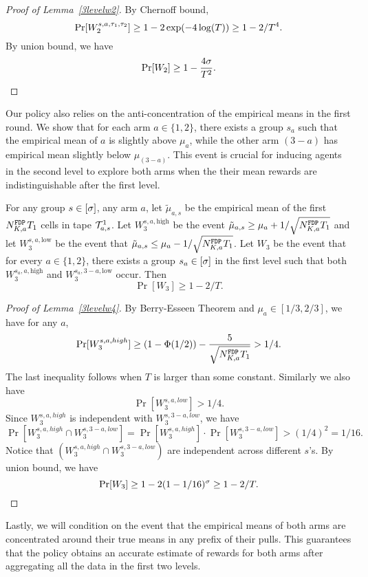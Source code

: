 \begin{proof}[Proof of Lemma~\ref{3levelw2}]
  By Chernoff bound,
\[
\Pr[W_2^{s,a,\tau_1,\tau_2}] \geq 1 - 2\exp(-4\log(T)) \geq 1- 2/T^4.
\]
By union bound, we have
\[
\Pr[W_2] \geq 1- \frac{4\sigma}{T^2}.
\]
\end{proof}

Our policy also relies on the anti-concentration of the empirical
means in the first round. We show that for each arm $a\in \{1, 2\}$,
there exists a group $s_a$ such that the empirical mean of $a$ is
slightly above $\mu_a$, while the other arm $(3 - a)$ has empirical
mean slightly below $\mu_{(3-a)}$. This event is crucial for inducing
agents in the second level to explore both arms when the their
mean rewards are indistinguishable after the first level.


\begin{lemma}\label{3levelw4}
  For any group $s\in [\sigma]$, any arm $a$, let $\tilde\mu_{a,s}$ be the
  empirical mean of the first $N^\mathtt{FDP}_{K,a}  T_1$ cells in tape $\mathcal{T}^1_{a, s}$.
  Let $W_3^{s,a,\text{high}}$ be the event
  $\tilde\mu_{a, s} \geq \mu_a + 1/\sqrt{N^\mathtt{FDP}_{K,a}  T_1}$ and let
  $W_3^{s,a,\text{low}}$ be the event that
  $\tilde\mu_{a, s} \leq \mu_a - 1/\sqrt{N^\mathtt{FDP}_{K,a}  T_1}$.  Let $W_3$ be the
  event that for every $a\in \{1, 2\}$, there exists a group
  $s_a\in [\sigma]$ in the first level such that both $W_3^{s_a,a,\text{high}}$
  and $W_3^{s_a,3-a,\text{low}}$ occur. Then
  \[
    \Pr[W_3]\geq 1 -2 /T.
  \]
\end{lemma}



\begin{proof}[Proof of Lemma~\ref{3levelw4}]
By Berry-Esseen Theorem and
  $\mu_a \in [1/3,2/3]$, we have for any $a$,
\[
\Pr[W_3^{s,a,high}] \geq (1-\Phi(1/2)) - \frac{5}{\sqrt{N^\mathtt{FDP}_{K,a} T_1}} > 1/4.
\]
The last inequality follows when $T$ is larger than some constant.
Similarly we also have
\[
\Pr[W_3^{s,a,low}] > 1/4.
\]
Since $W_3^{s,a,high}$ is independent with $W_3^{s,3-a,low}$, we have
\[
\Pr[W_3^{s,a,high} \cap W_3^{s,3-a,low}] =\Pr[W_3^{s,a,high}] \cdot  \Pr[W_3^{s,3-a,low}]>(1/4)^2 = 1/16.
\]
Notice that $(W_3^{s,a,high} \cap W_3^{s,3-a,low})$ are independent
across different $s$'s. By union bound, we have
\[
\Pr[W_3] \geq 1- 2(1-1/16)^\sigma \geq 1 -2 /T.
\]
\end{proof}



Lastly, we will condition on the event that the empirical means of
both arms are concentrated around their true means in any prefix of
their pulls. This guarantees that the policy obtains an accurate
estimate of rewards for both arms after aggregating all the data in
the first two levels.


